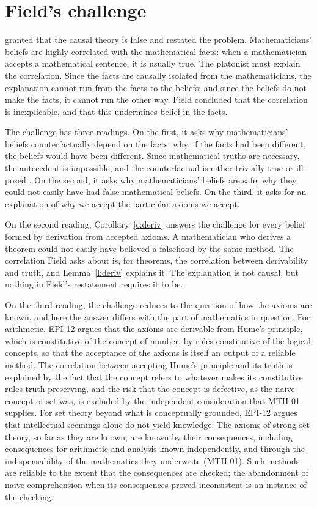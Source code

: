 \documentclass{situationist-preprint}
\begin{document}
\section{Field's challenge}

\citet{Field1989} granted that the causal theory is false and restated the problem. Mathematicians' beliefs are highly correlated with the mathematical facts: when a mathematician accepts a mathematical sentence, it is usually true. The platonist must explain the correlation. Since the facts are causally isolated from the mathematicians, the explanation cannot run from the facts to the beliefs; and since the beliefs do not make the facts, it cannot run the other way. Field concluded that the correlation is inexplicable, and that this undermines belief in the facts.

The challenge has three readings. On the first, it asks why mathematicians' beliefs counterfactually depend on the facts: why, if the facts had been different, the beliefs would have been different. Since mathematical truths are necessary, the antecedent is impossible, and the counterfactual is either trivially true or ill-posed \citep{ClarkeDoane2017}. On the second, it asks why mathematicians' beliefs are safe: why they could not easily have had false mathematical beliefs. On the third, it asks for an explanation of why we accept the particular axioms we accept.

On the second reading, Corollary~\ref{c:deriv} answers the challenge for every belief formed by derivation from accepted axioms. A mathematician who derives a theorem could not easily have believed a falsehood by the same method. The correlation Field asks about is, for theorems, the correlation between derivability and truth, and Lemma~\ref{l:deriv} explains it. The explanation is not causal, but nothing in Field's restatement requires it to be.

On the third reading, the challenge reduces to the question of how the axioms are known, and here the answer differs with the part of mathematics in question. For arithmetic, EPI-12 argues that the axioms are derivable from Hume's principle, which is constitutive of the concept of number, by rules constitutive of the logical concepts, so that the acceptance of the axioms is itself an output of a reliable method. The correlation between accepting Hume's principle and its truth is explained by the fact that the concept refers to whatever makes its constitutive rules truth-preserving, and the risk that the concept is defective, as the naive concept of set was, is excluded by the independent consideration that MTH-01 supplies. For set theory beyond what is conceptually grounded, EPI-12 argues that intellectual seemings alone do not yield knowledge. The axioms of strong set theory, so far as they are known, are known by their consequences, including consequences for arithmetic and analysis known independently, and through the indispensability of the mathematics they underwrite (MTH-01). Such methods are reliable to the extent that the consequences are checked; the abandonment of naive comprehension when its consequences proved inconsistent is an instance of the checking.
\end{document}

